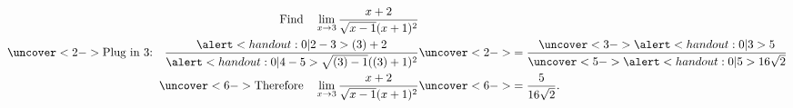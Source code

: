\begin{frame}
\begin{example}%
\abovedisplayskip=0pt
\belowdisplayskip=-15pt
\abovedisplayshortskip=0pt
\belowdisplayshortskip=0pt
\begin{align*}
\text{Find}\quad \lim_{x\to 3}
\frac%
{x+2}%
{\sqrt{x-1}(x+1)^2}%
& \\%
\uncover<2->{%
\text{Plug in 3:}\quad%
\frac%
{\alert<handout:0| 2-3>{(3)+2}}%
{\alert<handout:0| 4-5>{\sqrt{(3)-1}((3)+1)^2}}%
}%
& \uncover<2->{%
= \frac%
{\uncover<3->{\alert<handout:0| 3>{5}}}%
{\uncover<5->{\alert<handout:0| 5>{16\sqrt{2}}}}%
}\\%
\uncover<6->{%
\text{Therefore}\quad \lim_{x\to 3}\frac{x+2}{\sqrt{x-1}(x+1)^2}%
}%
& \uncover<6->{%
= \frac{5}{16\sqrt{2}}.}%
\end{align*}
\end{example}
\end{frame}
